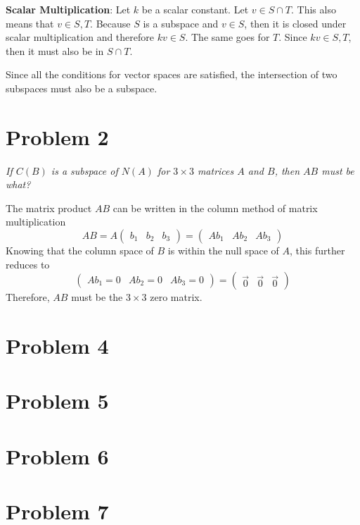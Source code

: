 \documentclass{article}
\begin{document}
\begin{enumerate}
    \bigbreak

    {\bf Scalar Multiplication}: Let $ k $ be a scalar constant. Let $ v \in
    S \cap T $. This also means that $ v \in S, T $. Because $ S $ is a
    subspace and $ v \in S $, then it is closed under scalar multiplication
    and therefore $ kv \in S $. The same goes for $ T $. Since $ kv \in S, T
    $, then it must also be in $ S \cap T $.

    \bigbreak

    Since all the conditions for vector spaces are satisfied, the intersection
    of two subspaces must also be a subspace.

\end{enumerate}

\section*{Problem 2}

\textit{If $C(B)$ is a subspace of $N(A)$ for $3\times 3$ matrices $A$ and
$B$, then $AB$ must be what?}

\bigbreak

The matrix product $ AB $ can be written in the column method of matrix
multiplication
$$ AB = A \begin{pmatrix}
    b_1 & b_2 & b_3
\end{pmatrix} 
= \begin{pmatrix}
    A b_1 & A b_2 & A b_3
\end{pmatrix} $$
Knowing that the column space of $ B $ is within the null space of $ A $, this
further reduces to
$$ \begin{pmatrix}
    A b_1 = 0 & A b_2 = 0 & A b_3 = 0
\end{pmatrix}
=
\begin{pmatrix}
    \vec{0} & \vec{0} & \vec{0}
\end{pmatrix} $$
Therefore, $ AB $ must be the $ 3 \times 3 $ zero matrix.

\section*{Problem 4}

\section*{Problem 5}

\section*{Problem 6}

\section*{Problem 7}
\end{document}
